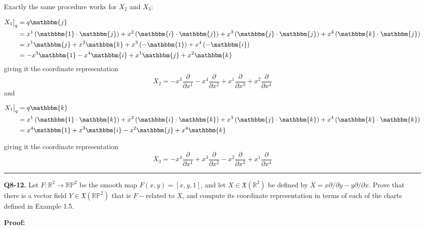 \documentclass{article}
\newcommand{\R}{\mathbb{R}}
\newcommand{\restr}[2]{{%
  \left.\kern-\nulldelimiterspace %
  #1 %
  \vphantom{\big|} %
  \right|_{#2} %
  }}
\begin{document}
\begin{enumerate}[label=(\alph*)]
  Exactly the same procedure works for $X_2$ and $X_3$:

  \begin{align*}
    \restr{X_1}{q} &= q\mathbbm{j} \\
    &= x^1 \left(\mathbbm{1} \cdot \mathbbm{j}\right) + x^2 \left(\mathbbm{i} \cdot \mathbbm{j}\right) + x^3 \left(\mathbbm{j} \cdot \mathbbm{j}\right) + x^4 \left(\mathbbm{k} \cdot \mathbbm{j}\right) \\
    &= x^1 \mathbbm{j} + x^2 \mathbbm{k} + x^3 \left(-\mathbbm{1}\right) + x^4 \left(-\mathbbm{i}\right) \\
    &= -x^3 \mathbbm{1} - x^4 \mathbbm{i} + x^1 \mathbbm{j} + x^2 \mathbbm{k}
  \end{align*}
  giving it the coordinate representation
  \[ X_2 = -x^3 \frac{\partial}{\partial x^1} - x^4 \frac{\partial}{\partial x^2} + x^1 \frac{\partial}{\partial x^3} + x^2 \frac{\partial}{\partial x^4}  \]
  and 

  \begin{align*}
    \restr{X_1}{q} &= q\mathbbm{k} \\
    &= x^1 \left(\mathbbm{1} \cdot \mathbbm{k}\right) + x^2 \left(\mathbbm{i} \cdot \mathbbm{k}\right) + x^3 \left(\mathbbm{j} \cdot \mathbbm{k}\right) + x^4 \left(\mathbbm{k} \cdot \mathbbm{k}\right) \\
    &= x^4 \mathbbm{1} + x^3 \mathbbm{i} - x^2 \mathbbm{j} + x^4 \mathbbm{k}
  \end{align*}

  giving it the coordinate representation 
  \[ X_3 = -x^4 \frac{\partial}{\partial x^1} + x^3 \frac{\partial}{\partial x^2} - x^2 \frac{\partial}{\partial x^3} + x^1 \frac{\partial}{\partial x^4}  \]
\end{enumerate}

\vskip 0.5cm
\hrule 
\vskip 0.5cm


\textbf{Q8-12.} Let $F : \R^2 \rightarrow \mathbb{RP}^2$ be the smooth map $F(x, y) = \left[x,y,1\right]$, and let $X \in \mathfrak{X}\left(\R^2\right)$ be defined by $X = x \partial / \partial y - y \partial / \partial x$. Prove that there is a vector field $Y \in \mathfrak{X} \left(\mathbb{RP}^2\right)$ that is $F-$related to $X$, and compute its coordinate representation in terms of each of the charts defined in Example 1.5. 

\vskip 0.5cm
\textbf{Proof:}
\end{document}
